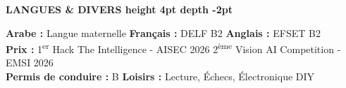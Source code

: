\documentclass[10pt,a4paper]{../../altacv}
\renewcommand{\cvsection}[2][]{%
  \medskip%
  {\color{heading}\LARGE\bfseries #2 \hspace{0.2em}\leaders\vrule height 4pt depth -2pt\hfill\mbox{}}\par\smallskip
}
\begin{document}
\cvsection{LANGUES \& DIVERS}
\textbf{Arabe :} Langue maternelle \hfill \textbf{Français :} DELF B2 \hfill \textbf{Anglais :} EFSET B2\\[2pt]
\textbf{Prix :} 1\textsuperscript{er} Hack The Intelligence - AISEC 2026 \hfill 2\textsuperscript{ème} Vision AI Competition - EMSI 2026\\[2pt]
\textbf{Permis de conduire :} B \hfill \textbf{Loisirs :} Lecture, Échecs, Électronique DIY
\end{document}
